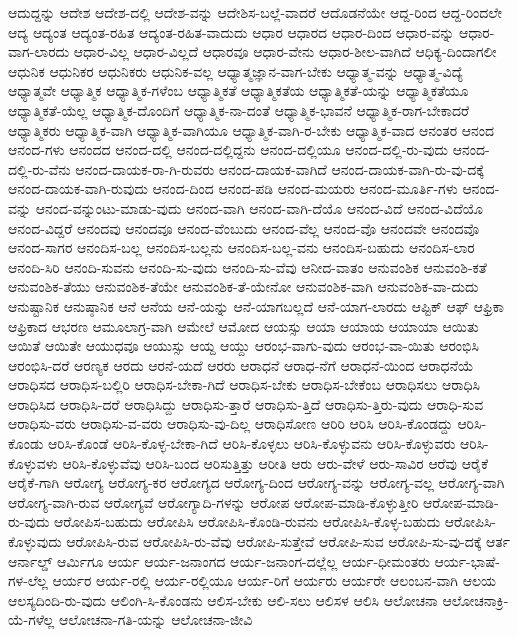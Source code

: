 {ಆದುದ್ದನ್ನು
ಆದೇಶ
ಆದೇಶ-ದಲ್ಲಿ
ಆದೇಶ-ವನ್ನು
ಆದೇಶಿಸ-ಬಲ್ಲೆ-ವಾದರೆ
ಆದೊಡನೆಯೇ
ಆದ್ದ-ರಿಂದ
ಆದ್ದ-ರಿಂದಲೇ
ಆದ್ಯ
ಆದ್ಯಂತ
ಆದ್ಯಂತ-ರಹಿತ
ಆದ್ಯಂತ-ರಹಿತ-ವಾದುದು
ಆಧಾರ
ಆಧಾರದ
ಆಧಾರ-ದಿಂದ
ಆಧಾರ-ವನ್ನು
ಆಧಾರ-ವಾಗ-ಲಾರದು
ಆಧಾರ-ವಿಲ್ಲ
ಆಧಾರ-ವಿಲ್ಲದೆ
ಆಧಾರವೂ
ಆಧಾರ-ವೇನು
ಆಧಾರ-ಶೀಲ-ವಾಗಿದೆ
ಆಧಿಕ್ಯ-ದಿಂದಾಗಲೀ
ಆಧುನಿಕ
ಆಧುನಿಕರ
ಆಧುನಿಕರು
ಆಧುನಿಕ-ವಲ್ಲ
ಆಧ್ಯಾತ್ಮಜ್ಞಾನ-ವಾಗ-ಬೇಕು
ಆಧ್ಯಾತ್ಮ-ವನ್ನು
ಆಧ್ಯಾತ್ಮ-ವಿದ್ಯೆ
ಆಧ್ಯಾತ್ಮವೇ
ಆಧ್ಯಾತ್ಮಿಕ
ಆಧ್ಯಾತ್ಮಿಕ-ಗಳೆಂಬ
ಆಧ್ಯಾತ್ಮಿಕತೆ
ಆಧ್ಯಾತ್ಮಿಕತೆಯ
ಆಧ್ಯಾತ್ಮಿಕತೆ-ಯನ್ನು
ಆಧ್ಯಾತ್ಮಿಕತೆಯೂ
ಆಧ್ಯಾತ್ಮಿಕತೆ-ಯೆಲ್ಲ
ಆಧ್ಯಾತ್ಮಿಕ-ದೊಂದಿಗೆ
ಆಧ್ಯಾತ್ಮಿಕ-ನಾ-ದಂತೆ
ಆಧ್ಯಾತ್ಮಿಕ-ಭಾವನೆ
ಆಧ್ಯಾತ್ಮಿಕ-ರಾಗ-ಬೇಕಾದರೆ
ಆಧ್ಯಾತ್ಮಿಕರು
ಆಧ್ಯಾತ್ಮಿಕ-ವಾಗಿ
ಆಧ್ಯಾತ್ಮಿಕ-ವಾಗಿಯೂ
ಆಧ್ಯಾತ್ಮಿಕ-ವಾಗಿ-ರ-ಬೇಕು
ಆಧ್ಯಾತ್ಮಿಕ-ವಾದ
ಆನಂತರ
ಆನಂದ
ಆನಂದ-ಗಳು
ಆನಂದದ
ಆನಂದ-ದಲ್ಲಿ
ಆನಂದ-ದಲ್ಲಿದ್ದನು
ಆನಂದ-ದಲ್ಲಿಯೂ
ಆನಂದ-ದಲ್ಲಿ-ರು-ವುದು
ಆನಂದ-ದಲ್ಲಿ-ರು-ವೆನು
ಆನಂದ-ದಾಯಕ-ರಾ-ಗಿ-ರುವರು
ಆನಂದ-ದಾಯಕ-ವಾಗಿದೆ
ಆನಂದ-ದಾಯಕ-ವಾಗಿ-ರು-ವು-ದಕ್ಕೆ
ಆನಂದ-ದಾಯಕ-ವಾಗಿ-ರುವುದು
ಆನಂದ-ದಿಂದ
ಆನಂದ-ಪಡಿ
ಆನಂದ-ಮಯರು
ಆನಂದ-ಮೂರ್ತಿ-ಗಳು
ಆನಂದ-ವನ್ನು
ಆನಂದ-ವನ್ನುಂಟು-ಮಾಡು-ವುದು
ಆನಂದ-ವಾಗಿ
ಆನಂದ-ವಾಗಿ-ದೆಯೊ
ಆನಂದ-ವಿದೆ
ಆನಂದ-ವಿದೆಯೊ
ಆನಂದ-ವಿದ್ದರೆ
ಆನಂದವು
ಆನಂದವೂ
ಆನಂದ-ವೆಂಬುದು
ಆನಂದ-ವೆಲ್ಲ
ಆನಂದ-ವೊ
ಆನಂದವೇ
ಆನಂದವೊ
ಆನಂದ-ಸಾಗರ
ಆನಂದಿಸ-ಬಲ್ಲ
ಆನಂದಿಸ-ಬಲ್ಲನು
ಆನಂದಿಸ-ಬಲ್ಲ-ವನು
ಆನಂದಿಸ-ಬಹುದು
ಆನಂದಿಸ-ಲಾರ
ಆನಂದಿ-ಸಿರಿ
ಆನಂದಿ-ಸುವನು
ಆನಂದಿ-ಸು-ವುದು
ಆನಂದಿ-ಸು-ವೆವು
ಆನೀದ-ವಾತಂ
ಆನುವಂಶಿಕ
ಆನುವಂಶಿ-ಕತೆ
ಆನುವಂಶಿಕ-ತೆಯು
ಆನುವಂಶಿಕ-ತೆಯೇ
ಆನುವಂಶಿಕ-ತೆ-ಯೇನೋ
ಆನುವಂಶಿಕ-ವಾಗಿ
ಆನುವಂಶಿಕ-ವಾ-ದುದು
ಆನುಷ್ಟಾನಿಕ
ಆನುಷ್ಠಾನಿಕ
ಆನೆ
ಆನೆಯ
ಆನೆ-ಯನ್ನು
ಆನೆ-ಯಾಗಬಲ್ಲದೆ
ಆನೆ-ಯಾಗ-ಲಾರದು
ಆಪ್ಟಿಕ್
ಆಫ್
ಆಫ್ರಿಕಾ
ಆಫ್ರಿಕಾದ
ಆಭರಣ
ಆಮೂಲಾಗ್ರ-ವಾಗಿ
ಆಮೇಲೆ
ಆಮೋದ
ಆಯಸ್ಸು
ಆಯಾ
ಆಯಾಯ
ಆಯಾಯಾ
ಆಯಿತು
ಆಯಿತೆ
ಆಯಿತೇ
ಆಯುಧವೂ
ಆಯುಸ್ಸು
ಆಯ್ದ
ಆಯ್ದು
ಆರಂಭ-ವಾಗು-ವುದು
ಆರಂಭ-ವಾ-ಯಿತು
ಆರಂಭಿಸಿ
ಆರಂಭಿಸಿ-ದರೆ
ಆರಣ್ಯಕ
ಆರದು
ಆರನೆ-ಯದೆ
ಆರರು
ಆರಾಧನೆ
ಆರಾಧ-ನೆಗೆ
ಆರಾಧನೆ-ಯಿಂದ
ಆರಾಧನೆಯೆ
ಆರಾಧಿಸದ
ಆರಾಧಿಸ-ಬಲ್ಲಿರಿ
ಆರಾಧಿಸ-ಬೇಕಾ-ಗಿದೆ
ಆರಾಧಿಸ-ಬೇಕು
ಆರಾಧಿಸ-ಬೇಕೆಂಬ
ಆರಾಧಿಸಲು
ಆರಾಧಿಸಿ
ಆರಾಧಿಸಿದ
ಆರಾಧಿಸಿ-ದರೆ
ಆರಾಧಿಸಿದ್ದು
ಆರಾಧಿಸು-ತ್ತಾರೆ
ಆರಾಧಿಸು-ತ್ತಿದೆ
ಆರಾಧಿಸು-ತ್ತಿರು-ವುದು
ಆರಾಧಿ-ಸುವ
ಆರಾಧಿಸು-ವರು
ಆರಾಧಿಸು-ವ-ವರು
ಆರಾಧಿಸು-ವು-ದಿಲ್ಲ
ಆರಾಧಿಸೋಣ
ಆರಿರಿ
ಆರಿಸಿ
ಆರಿಸಿ-ಕೊಂಡದ್ದು
ಆರಿಸಿ-ಕೊಂಡು
ಆರಿಸಿ-ಕೊಂಡೆ
ಆರಿಸಿ-ಕೊಳ್ಳ-ಬೇಕಾ-ಗಿದೆ
ಆರಿಸಿ-ಕೊಳ್ಳಲು
ಆರಿಸಿ-ಕೊಳ್ಳುವನು
ಆರಿಸಿ-ಕೊಳ್ಳುವರು
ಆರಿಸಿ-ಕೊಳ್ಳುವಳು
ಆರಿಸಿ-ಕೊಳ್ಳುವೆವು
ಆರಿಸಿ-ಬಂದ
ಆರಿಸುತ್ತಿತ್ತು
ಆರೀತಿ
ಆರು
ಆರು-ವೇಳೆ
ಆರು-ಸಾವಿರ
ಆರೆವು
ಆರೈಕೆ
ಆರೈಕೆ-ಗಾಗಿ
ಆರೋಗ್ಯ
ಆರೋಗ್ಯ-ಕರ
ಆರೋಗ್ಯದ
ಆರೋಗ್ಯ-ದಿಂದ
ಆರೋಗ್ಯ-ವನ್ನು
ಆರೋಗ್ಯ-ವಲ್ಲ
ಆರೋಗ್ಯ-ವಾಗಿ
ಆರೋಗ್ಯ-ವಾಗಿ-ರುವ
ಆರೋಗ್ಯವೆ
ಆರೋಗ್ಯಾದಿ-ಗಳನ್ನು
ಆರೋಪ
ಆರೋಪ-ಮಾಡಿ-ಕೊಳ್ಳುತ್ತೀರಿ
ಆರೋಪ-ಮಾಡಿ-ರು-ವುದು
ಆರೋಪಿಸ-ಬಹುದು
ಆರೋಪಿಸಿ
ಆರೋಪಿಸಿ-ಕೊಂಡಿ-ರುವನು
ಆರೋಪಿಸಿ-ಕೊಳ್ಳ-ಬಹುದು
ಆರೋಪಿಸಿ-ಕೊಳ್ಳುವುದು
ಆರೋಪಿಸಿ-ರುವ
ಆರೋಪಿಸಿ-ರು-ವೆವು
ಆರೋಪಿ-ಸುತ್ತೇವೆ
ಆರೋಪಿ-ಸುವ
ಆರೋಪಿ-ಸು-ವು-ದಕ್ಕೆ
ಆರ್ತ
ಆರ್ನಾಲ್ಡ್
ಆರ್ಮಿಗೂ
ಆರ್ಯ
ಆರ್ಯ-ಜನಾಂಗದ
ಆರ್ಯ-ಜನಾಂಗ-ದಲ್ಲೆಲ್ಲ
ಆರ್ಯ-ಧೀಮಂತರು
ಆರ್ಯ-ಭಾಷೆ-ಗಳ-ಲೆಲ್ಲ
ಆರ್ಯರ
ಆರ್ಯ-ರಲ್ಲಿ
ಆರ್ಯ-ರಲ್ಲಿಯೂ
ಆರ್ಯ-ರಿಗೆ
ಆರ್ಯರು
ಆರ್ಯರೇ
ಆಲಂಬನ-ವಾಗಿ
ಆಲಯ
ಆಲಸ್ಯದಿಂದಿ-ರು-ವುದು
ಆಲಿಂಗಿ-ಸಿ-ಕೊಂಡನು
ಆಲಿಸ-ಬೇಕು
ಆಲಿ-ಸಲು
ಆಲಿಸಳ
ಆಲಿಸಿ
ಆಲೋಚನಾ
ಆಲೋಚನಾಕ್ರಿ-ಯೆ-ಗಳೆಲ್ಲ
ಆಲೋಚನಾ-ಗತಿ-ಯನ್ನು
ಆಲೋಚನಾ-ಜೀವಿ
}
